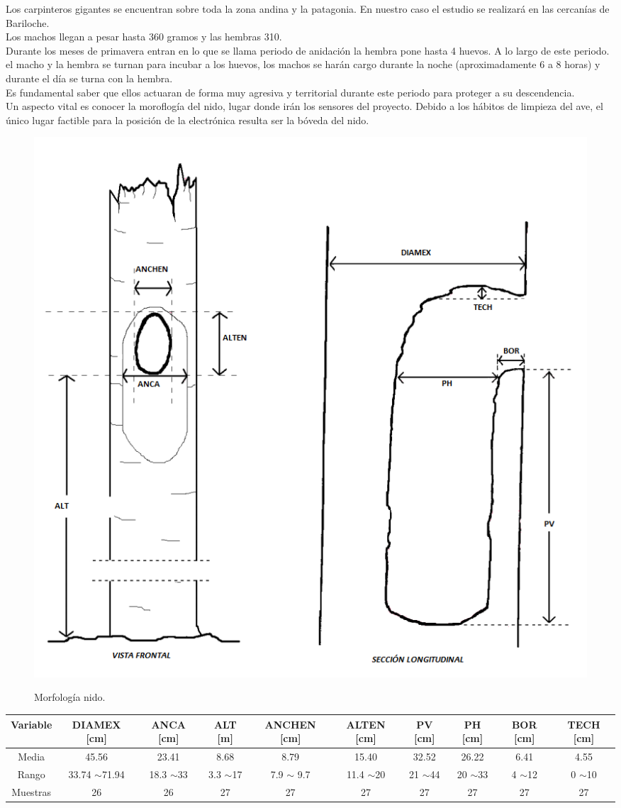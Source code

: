 Los carpinteros gigantes se encuentran sobre toda la zona andina y la patagonia. En nuestro caso el estudio se realizará en las cercanías de Bariloche.
\\
Los machos llegan a pesar hasta 360 gramos y las hembras 310.\\
Durante los meses de primavera entran en lo que se llama periodo de anidación la hembra pone hasta 4 huevos. A lo largo de este periodo. el macho y la hembra se turnan para incubar a los huevos, los machos se harán cargo durante la noche (aproximadamente 6 a 8 horas) y durante el día se turna con la hembra. \\
Es fundamental saber que ellos actuaran de forma muy agresiva y territorial durante este periodo para proteger a su descendencia. \\
Un aspecto vital es conocer la moroflogía del nido, lugar donde irán los sensores del proyecto.
Debido a los hábitos de limpieza del ave, el único lugar factible para la posición de la electrónica resulta ser la bóveda del nido. 
\begin{figure}[H]
	\centering
	\includegraphics[width=0.7\linewidth]{ImagenesIntroduccion/morfologia_nido}
	\label{fig:morfología_nido}
	\caption{Morfología nido.}
\end{figure}
\begin{table}[H]
\centering
\begin{tabular}{|c|c|c|c|c|c|c|c|c|c|}
\hline
Variable & DIAMEX {[}cm{]}   & ANCA {[}cm{]} & ALT {[}m{]}  & ANCHEN {[}cm{]} & ALTEN {[}cm{]} & PV {[}cm{]} & PH {[}cm{]} & BOR {[}cm{]} & TECH {[}cm{]} \\ \hline
Media    & 45.56             & 23.41         & 8.68         & 8.79            & 15.40          & 32.52       & 26.22       & 6.41         & 4.55          \\ \hline
Rango    & 33.74 $\sim$71.94 & 18.3 $\sim$33 & 3.3 $\sim$17 & 7.9 $\sim$ 9.7  & 11.4 $\sim$20  & 21 $\sim$44 & 20 $\sim$33 & 4 $\sim$12   & 0 $\sim$10    \\ \hline
Muestras & 26                & 26            & 27           & 27              & 27             & 27          & 27          & 27           & 27            \\ \hline
\end{tabular}
\end{table}




